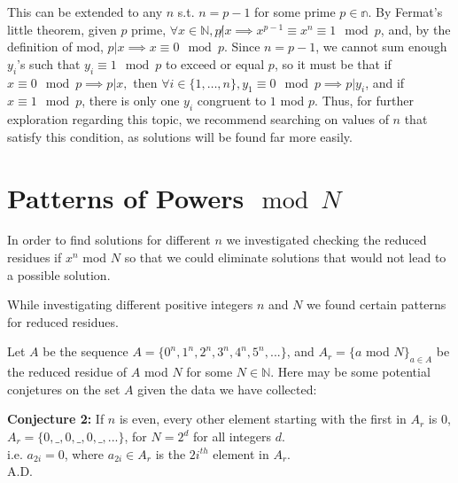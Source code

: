 \documentclass{article}
\begin{document}
\begin{flushleft}
This can be extended to any $n$ s.t. $n = p - 1$ for some prime $p \in \mathbb{n}$. By Fermat's little theorem, given $p$ prime, $\forall x \in \mathbb{N}, p \not| x \implies x^{p - 1} \equiv x^n \equiv 1 \mod p$, and, by the definition of mod, $p | x \implies x \equiv 0 \mod p$. Since $n = p - 1$, we cannot sum enough $y_i$'s such that $y_i \equiv 1 \mod p$ to exceed or equal $p$, so it must be that if $x \equiv 0 \mod p \implies p | x,$ then $\forall i \in \{1, \ldots, n\}, y_1 \equiv 0 \mod p \implies p | y_i$, and if $x \equiv 1 \mod p$, there is only one $y_i$ congruent to $1$ mod $p$. Thus, for further exploration regarding this topic, we recommend searching on values of $n$ that satisfy this condition, as solutions will be found far more easily.

\section{Patterns of Powers$\mod N$}
In order to find solutions for different $n$ we investigated checking the reduced residues if $x^n$ mod $N$ so that we could eliminate solutions that would not lead to a possible solution. 

\vspace{.1in}

While investigating different positive integers $n$ and $N$ we found certain patterns for reduced residues. 

\vspace{.1in}

Let $A$ be the sequence $A = \{0^n,1^n,2^n,3^n,4^n,5^n,...\}$, and $A_r = \{a$ mod $N\}_{a\in A}$ be the reduced residue of $A$ mod $N$ for some $N\in\mathbb{N}$. Here may be some potential conjetures on the set $A$ given the data we have collected:

\vspace{.1in}

{\bf Conjecture 2:} If $n$ is even, every other element starting with the first in $A_r$ is $0$, $A_r=\{0,\_,0,\_,0,\_,...\}$, for $N=2^d$ for all integers $d$. \\
    \hspace{.2in} i.e. $a_{2i}=0$, where $a_{2i}\in A_r$ is the $2i^{th}$ element in $A_r$. \\
    \hspace{4.3in} A.D.


\end{flushleft}
\end{document}
